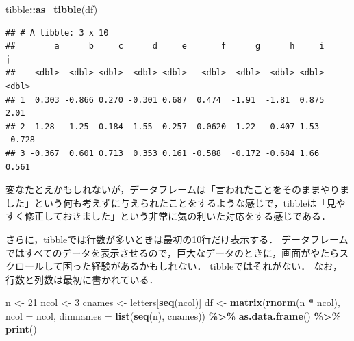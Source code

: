 \documentclass[
]{article}
\newenvironment{Shaded}{\begin{snugshade}}{\end{snugshade}}
\newcommand{\AttributeTok}[1]{\textcolor[rgb]{0.13,0.29,0.53}{#1}}
\newcommand{\DecValTok}[1]{\textcolor[rgb]{0.00,0.00,0.81}{#1}}
\newcommand{\FunctionTok}[1]{\textcolor[rgb]{0.13,0.29,0.53}{\textbf{#1}}}
\newcommand{\NormalTok}[1]{#1}
\newcommand{\OtherTok}[1]{\textcolor[rgb]{0.56,0.35,0.01}{#1}}
\newcommand{\SpecialCharTok}[1]{\textcolor[rgb]{0.81,0.36,0.00}{\textbf{#1}}}
\begin{document}
\begin{Shaded}
\begin{Highlighting}[]
\NormalTok{tibble}\SpecialCharTok{::}\FunctionTok{as\_tibble}\NormalTok{(df)}
\end{Highlighting}
\end{Shaded}

\begin{verbatim}
## # A tibble: 3 x 10
##        a      b     c      d     e       f      g      h     i      j
##    <dbl>  <dbl> <dbl>  <dbl> <dbl>   <dbl>  <dbl>  <dbl> <dbl>  <dbl>
## 1  0.303 -0.866 0.270 -0.301 0.687  0.474  -1.91  -1.81  0.875  2.01 
## 2 -1.28   1.25  0.184  1.55  0.257  0.0620 -1.22   0.407 1.53  -0.728
## 3 -0.367  0.601 0.713  0.353 0.161 -0.588  -0.172 -0.684 1.66   0.561
\end{verbatim}

変なたとえかもしれないが，データフレームは「言われたことをそのままやりました」という何も考えずに与えられたことをするような感じで，tibbleは「見やすく修正しておきました」という非常に気の利いた対応をする感じである．

さらに，tibbleでは行数が多いときは最初の10行だけ表示する．
データフレームではすべてのデータを表示させるので，巨大なデータのときに，画面がやたらスクロールして困った経験があるかもしれない．
tibbleではそれがない．
なお，行数と列数は最初に書かれている．

\begin{Shaded}
\begin{Highlighting}[]
\NormalTok{n }\OtherTok{\textless{}{-}} \DecValTok{21}
\NormalTok{ncol }\OtherTok{\textless{}{-}} \DecValTok{3}
\NormalTok{cnames }\OtherTok{\textless{}{-}}\NormalTok{ letters[}\FunctionTok{seq}\NormalTok{(ncol)]}
\NormalTok{df }\OtherTok{\textless{}{-}} 
  \FunctionTok{matrix}\NormalTok{(}\FunctionTok{rnorm}\NormalTok{(n }\SpecialCharTok{*}\NormalTok{ ncol), }\AttributeTok{ncol =}\NormalTok{ ncol, }\AttributeTok{dimnames =} \FunctionTok{list}\NormalTok{(}\FunctionTok{seq}\NormalTok{(n), cnames)) }\SpecialCharTok{\%\textgreater{}\%}
  \FunctionTok{as.data.frame}\NormalTok{() }\SpecialCharTok{\%\textgreater{}\%}
  \FunctionTok{print}\NormalTok{()}
\end{Highlighting}
\end{Shaded}
\end{document}
